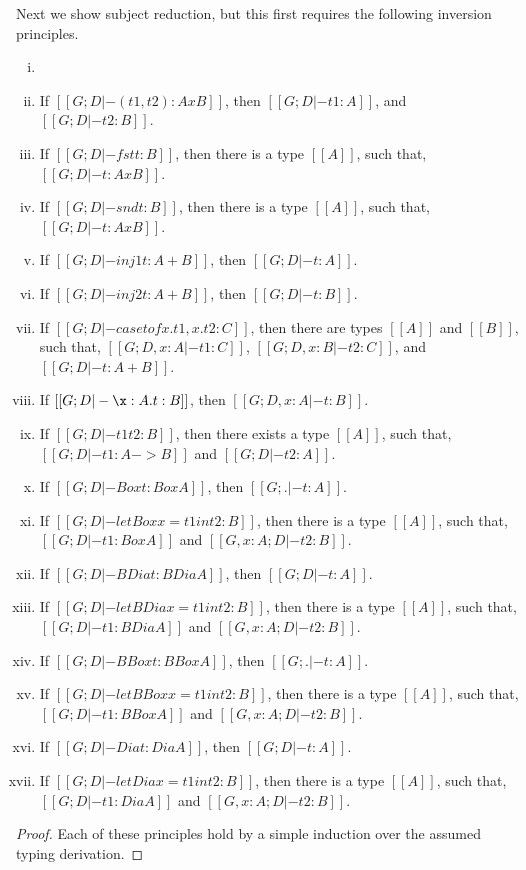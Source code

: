 Next we show subject reduction, but this first requires the following
inversion principles.
\begin{lemma}[Inversion]
  \label{lemma:inversion}
  \begin{enumerate}[i.]
  \item[]
  \item If $[[G; D |- (t1, t2) : A x B]]$, then $[[G;D |- t1 : A]]$, and $[[G;D |- t2 : B]]$.
  \item If $[[G; D |- fst t : B]]$, then there is a type $[[A]]$, such that, $[[G; D |- t : A x B]]$.
  \item If $[[G; D |- snd t : B]]$, then there is a type $[[A]]$, such that, $[[G; D |- t : A x B]]$.
  \item If $[[G; D |- inj1 t : A + B]]$, then $[[G; D |- t : A]]$.
  \item If $[[G; D |- inj2 t : A + B]]$, then $[[G; D |- t : B]]$.
  \item If $[[G; D |- case t of x.t1,x.t2 : C]]$, then there are types $[[A]]$ and $[[B]]$,
    such that, $[[G;D, x : A |- t1 : C]]$, $[[G;D, x : B |- t2 : C]]$, and $[[G;D |- t : A + B]]$.
  \item If $[[G;D |- \x:A.t : B]]$, then $[[G;D,x : A |- t : B]]$.    
  \item If $[[G;D |- t1 t2 : B]]$, then there exists a type $[[A]]$, such that, $[[G;D |- t1 : A -> B]]$ and $[[G;D |- t2 : A]]$.
  \item If $[[G;D |- Box t : Box A]]$, then $[[G;. |- t : A]]$.
  \item If $[[G;D |- letBox x = t1 in t2 : B]]$, then there is a type $[[A]]$, such that,
    $[[G;D |- t1 : Box A]]$ and $[[G,x : A;D |- t2 : B]]$.
  \item If $[[G;D |- BDia t : BDia A]]$, then $[[G;D |- t : A]]$.
  \item If $[[G;D |- letBDia x = t1 in t2 : B]]$, then there is a type $[[A]]$, such that,
    $[[G;D |- t1 : BDia A]]$ and $[[G,x : A;D |- t2 : B]]$.
  \item If $[[G;D |- BBox t : BBox A]]$, then $[[G;. |- t : A]]$.
  \item If $[[G;D |- letBBox x = t1 in t2 : B]]$, then there is a type $[[A]]$, such that,
    $[[G;D |- t1 : BBox A]]$ and $[[G,x : A;D |- t2 : B]]$.
  \item If $[[G;D |- Dia t : Dia A]]$, then $[[G;D |- t : A]]$.
  \item If $[[G;D |- letDia x = t1 in t2 : B]]$, then there is a type $[[A]]$, such that,
    $[[G;D |- t1 : Dia A]]$ and $[[G,x : A;D |- t2 : B]]$.
  \end{enumerate}
\end{lemma}
\begin{proof}
  Each of these principles hold by a simple induction over the assumed
  typing derivation.
\end{proof}


